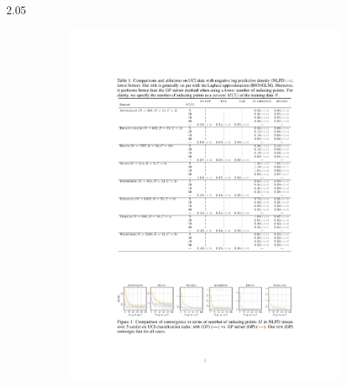 \documentclass[final,12pt]{beamer}
\newlength{\colwidth}
\newcommand{\our}{SFR}
\begin{document}
\begin{frame}[t]
\begin{columns}[t]
\begin{column}{2.05\colwidth}
\begin{minipage}{\textwidth}
\begin{figure}[t!]
\begin{subfigure}[b]{0.65\textwidth}
    \label{fig:teaser}
    \end{subfigure}
    \hspace{2cm}
    \begin{subfigure}{0.3\textwidth}\centering
    \centering
        \includegraphics[scale=5]{fig/nlpd.pdf}

\end{subfigure}
\end{figure}
\end{minipage}
\end{column}
\end{columns}
\end{frame}
\end{document}
